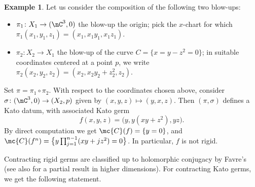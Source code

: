 \documentclass[11 pt, twoside, a4paper]{amsart}
\newcommand{\Kpi}{{\pi}} %
\newcommand{\Ksigma}{{\sigma}} %
\theoremstyle{definition}
\newtheorem{ex}[thm]{Example}
\theoremstyle{definition}
\begin{document}
\begin{ex}\label{ex:nonrigidkatoSNC}
Let us consider the composition of the following two blow-ups:
\begin{itemize}
\item $\pi_1 \colon X_1 \to (\nC^3,0)$ the blow-up the origin; pick the $x$-chart for which $\pi_1(x_1,y_1,z_1)=(x_1,x_1y_1,x_1z_1)$.
\item $\pi_2 \colon X_2 \to X_1$ the blow-up of the curve $C=\{x=y-z^2=0\}$; in suitable coordinates centered at a point $p$, we write $\pi_2(x_2,y_2,z_2)=(x_2, x_2y_2+z_2^2, z_2)$.
\end{itemize}
Set $\Kpi=\pi_1 \circ \pi_2$.
With respect to the coordinates chosen above, consider $\Ksigma\colon (\nC^3,0) \to (X_2,p)$ given by $(x,y,z) \mapsto (y,x,z)$.
Then $(\Kpi,\Ksigma)$ defines a Kato datum, with associated Kato germ
\[
f(x,y,z)=\big(y,y(xy+z^2),yz\big).
\]
By direct computation we get $\mc{C}(f)=\{y=0\}$, and $\mc{C}(f^n)=\big\{y \prod_{j=1}^{n-1} (xy+jz^2)=0\big\}$. In particular, $f$ is not rigid.
\end{ex}

Contracting rigid germs are classified up to holomorphic conjugacy by Favre's \cite{favre:rigidgerms} (see also \cite{ruggiero:rigidgerms} for a partial result in higher dimensions). For contracting Kato germs, we get the following statement.
\end{document}
